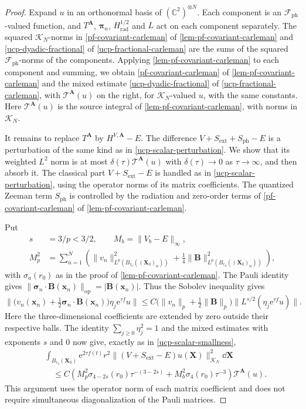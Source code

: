 \documentclass[final,reqno]{amsart}
\theoremstyle{remark}
\newcommand{\CC}{\mathbb{C}}
\newcommand{\e}{\mathrm{e}}
\newcommand{\ph}{\mathrm{ph}}
\newcommand{\rad}{\mathrm{rad}}
\newcommand{\Fock}{\mathcal{F}}
\newcommand{\vsigma}{{\bm{\sigma}}}
\newcommand{\vpi}{{\bm{\pi}}}
\newcommand{\vx}{\mathbf{x}}
\newcommand{\vA}{{\mathbf{A}}}
\newcommand{\vB}{{\mathbf{B}}}
\newcommand{\vX}{{\mathbf{X}}}
\begin{document}
\begin{proof}
Expand $u$ in an orthonormal basis of $(\CC^2)^{\otimes N}$.  Each
component is an $\Fock_\ph$-valued function, and $T^{\vA}$, $\vpi_n$,
$H_\rad^{1/2}$ and $L$ act on each component separately.  The squared
$\mathcal K_N$-norms in \cref{pf-covariant-carleman} of \cref{lem-pf-covariant-carleman}
and \cref{ucp-dyadic-fractional} of \cref{ucp-fractional-carleman}
are the sums of the squared $\Fock_\ph$-norms of the components.
Applying \cref{lem-pf-covariant-carleman} to each component and
summing, we obtain \cref{pf-covariant-carleman} of \cref{lem-pf-covariant-carleman} and the mixed estimate
\cref{ucp-dyadic-fractional} of \cref{ucp-fractional-carleman}, with $\mathcal T^{\vA}(u)$ on the right,
for $\mathcal K_N$-valued $u$, with the same constants.  Here
$\mathcal T^{\vA}(u)$ is the source integral of
\cref{lem-pf-covariant-carleman}, with norms in $\mathcal K_N$.

It remains to replace $T^{\vA}$ by $H^{V,\vA}-E$.  The difference
$V+S_{\mathrm{ext}}+S_{\mathrm{ph}}-E$ is a perturbation of the
same kind as in \cref{ucp-scalar-perturbation}.  We show that its
weighted $L^2$ norm is at most $\delta(\tau)\mathcal T^{\vA}(u)$ with
$\delta(\tau)\to0$ as $\tau\to\infty$, and then absorb it.  The
classical part $V+S_{\mathrm{ext}}-E$ is handled as in
\cref{ucp-scalar-perturbation}, using the operator norms of its matrix
coefficients.  The quantized Zeeman term $S_{\mathrm{ph}}$ is
controlled by the radiation and zero-order terms of
\cref{pf-covariant-carleman} of \cref{lem-pf-covariant-carleman}.

Put
\[
 \begin{split}
 s&=3/p<3/2,\qquad M_b=\|V_b-E\|_\infty,\\
 M_p^2&=\sum_{n=1}^N\left(
       \|v_n\|_{L^p(B_{r_0}((\vX_0)_n))}^2
       +\tfrac14\|\vB\|_{L^p(B_{r_0}((\vX_0)_n))}^2\right),
 \end{split}
\]
with $\sigma_a(r_0)$ as in the proof of \cref{lem-pf-covariant-carleman}.
The Pauli identity gives
$\|\vsigma_n\cdot\vB(\vx_n)\|_{\mathrm{op}}=|\vB(\vx_n)|$.
Thus the Sobolev inequality gives
\[
 \big\|\big(v_n(\vx_n)+\tfrac12
                    \vsigma_n\cdot\vB(\vx_n)\big)\eta_j\e^{\tau f}u\big\|
 \leq C\big(\|v_n\|_p+\tfrac12\|\vB\|_p\big)
                                      \|L^{s/2}(\eta_j\e^{\tau f}u)\|.
\]
Here the three-dimensional coefficients are extended by zero outside
their respective balls.  The identity $\sum_{j\geq0}\eta_j^2=1$ and the mixed
estimates with exponents $s$ and $0$ now give, exactly as in
\cref{ucp-scalar-smallness},
\begin{equation}\label{pauli-classical-smallness}
 \begin{aligned}
 &\int_{B_{r_0}(\vX_0)}\e^{2\tau f(t)}r^2\|(V+S_{\mathrm{ext}}-E)u(\vX)\|_{\mathcal K_N}^2\dd\vX\\
 &\quad\leq C\left(
 M_p^2\sigma_{4-2s}(r_0)\tau^{-(3-2s)}
       +M_b^2\sigma_4(r_0)\tau^{-3}\right)\mathcal T^{\vA}(u).
 \end{aligned}
\end{equation}
This argument uses the operator norm of each matrix coefficient and
does not require simultaneous diagonalization of the Pauli matrices.


\end{proof}
\end{document}
